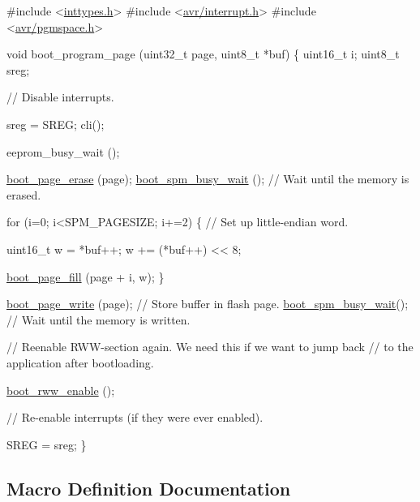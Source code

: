 \begin{DoxyCode}
\textcolor{preprocessor}{#include <\hyperlink{inttypes_8h}{inttypes.h}>}
\textcolor{preprocessor}{#include <\hyperlink{interrupt_8h}{avr/interrupt.h}>}
\textcolor{preprocessor}{#include <\hyperlink{pgmspace_8h}{avr/pgmspace.h}>}

\textcolor{keywordtype}{void} boot\_program\_page (uint32\_t page, uint8\_t *buf)
\{
    uint16\_t i;
    uint8\_t sreg;

    \textcolor{comment}{// Disable interrupts.}

    sreg = SREG;
    cli();

    eeprom\_busy\_wait ();

    \hyperlink{group__avr__boot_ga8c128c031cee4e82ea4950873048db14}{boot\_page\_erase} (page);
    \hyperlink{group__avr__boot_gada801d48596bd6e0119b310ea5887247}{boot\_spm\_busy\_wait} ();      \textcolor{comment}{// Wait until the memory is erased.}

    \textcolor{keywordflow}{for} (i=0; i<SPM\_PAGESIZE; i+=2)
    \{
        \textcolor{comment}{// Set up little-endian word.}

        uint16\_t w = *buf++;
        w += (*buf++) << 8;
    
        \hyperlink{group__avr__boot_ga61add108c778273ff68233d044c3acca}{boot\_page\_fill} (page + i, w);
    \}

    \hyperlink{group__avr__boot_ga8764dc7bdbd459e5d850bafaa0a6e41a}{boot\_page\_write} (page);     \textcolor{comment}{// Store buffer in flash page.}
    \hyperlink{group__avr__boot_gada801d48596bd6e0119b310ea5887247}{boot\_spm\_busy\_wait}();       \textcolor{comment}{// Wait until the memory is written.}

    \textcolor{comment}{// Reenable RWW-section again. We need this if we want to jump back}
    \textcolor{comment}{// to the application after bootloading.}

    \hyperlink{group__avr__boot_ga5ce9d92fa9c0b2b79c62a09980909f1f}{boot\_rww\_enable} ();

    \textcolor{comment}{// Re-enable interrupts (if they were ever enabled).}

    SREG = sreg;
\}
\end{DoxyCode}
 

\subsection{Macro Definition Documentation}
